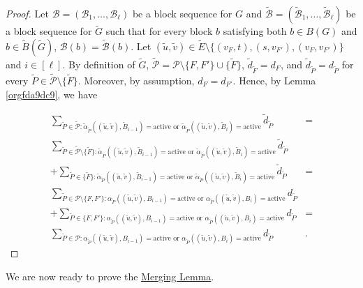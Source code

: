 \documentclass[fontsize=11pt,paper=a4]{book}
\begin{document}
\begin{proof}
Let \(\mathcal{B}=(\mathscr{B}_1,\dots,\mathscr{B}_{\ell})\) be a block sequence for \(G\) and \(\tilde{\mathcal{B}}=(\tilde{\mathscr{B}}_1,\dots,\tilde{\mathscr{B}}_{\ell})\) be a block sequence for \(\tilde{G}\) such that for every block \(b\) satisfying both \(b\in B(G)\) and \(b\in\tilde{B}(\tilde{G})\), \(\mathcal{B}(b)=\tilde{\mathcal{B}}(b)\).
Let \((\tilde{u},\tilde{v})\in\tilde{E}\setminus\{(v_F,t),(s,v_{F'}),(v_F,v_{F'})\}\) and \(i\in[\ell]\).
By definition of \(\tilde{G}\), \(\tilde{\mathcal{P}}=\mathcal{P}\setminus\{F,F'\}\cup\{\tilde{F}\}\), \(\tilde{d}_{\tilde{F}}=d_F\), and \(\tilde{d}_{\tilde{P}}=d_{\tilde{P}}\) for every \(\tilde{P}\in\tilde{\mathcal{P}}\setminus\{\tilde{F}\}\).
Moreover, by assumption, \(d_F=d_{F'}\).
Hence, by Lemma \ref{orgfda9dc9}, we have

\begin{align*}
\sum_{\tilde{P}\in\tilde{\mathcal{P}}:\tilde{\alpha}_{\tilde{P}}((\tilde{u},\tilde{v}),\tilde{B}_{i-1})=\mathrm{active}\text{ or }\tilde{\alpha}_{\tilde{P}}((\tilde{u},\tilde{v}),\tilde{B}_i)=\mathrm{active}}\tilde{d}_{\tilde{P}}&=\\
\sum_{\tilde{P}\in\tilde{\mathcal{P}}\setminus\{\tilde{F}\}:\tilde{\alpha}_{\tilde{P}}((\tilde{u},\tilde{v}),\tilde{B}_{i-1})=\mathrm{active}\text{ or }\tilde{\alpha}_{\tilde{P}}((\tilde{u},\tilde{v}),\tilde{B}_i)=\mathrm{active}}\tilde{d}_{\tilde{P}}&\\
+\sum_{\tilde{P}\in\{\tilde{F}\}:\tilde{\alpha}_{\tilde{P}}((\tilde{u},\tilde{v}),\tilde{B}_{i-1})=\mathrm{active}\text{ or }\tilde{\alpha}_{\tilde{P}}((\tilde{u},\tilde{v}),\tilde{B}_i)=\mathrm{active}}\tilde{d}_{\tilde{P}}&=\\
\sum_{\tilde{P}\in\mathcal{P}\setminus\{F,F'\}:\alpha_{\tilde{P}}((\tilde{u},\tilde{v}),B_{i-1})=\mathrm{active}\text{ or }\alpha_{\tilde{P}}((\tilde{u},\tilde{v}),B_i)=\mathrm{active}}d_{\tilde{P}}&\\
+\sum_{\tilde{P}\in\{F,F'\}:\alpha_{\tilde{P}}((\tilde{u},\tilde{v}),B_{i-1})=\mathrm{active}\text{ or }\alpha_{\tilde{P}}((\tilde{u},\tilde{v}),B_i)=\mathrm{active}}d_{\tilde{P}}&=\\
\sum_{\tilde{P}\in\mathcal{P}:\alpha_{\tilde{P}}((\tilde{u},\tilde{v}),B_{i-1})=\mathrm{active}\text{ or }\alpha_{\tilde{P}}((\tilde{u},\tilde{v}),B_i)=\mathrm{active}}d_{\tilde{P}}&.
\end{align*}
\end{proof}

We are now ready to prove the \hyperref[org44b4347]{Merging Lemma}.
\end{document}
